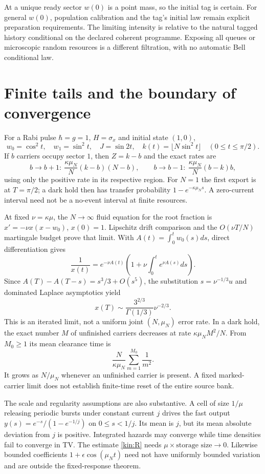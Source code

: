 \documentclass[11pt,oneside,openany]{book}
\theoremstyle{definition}
\theoremstyle{remark}\newtheorem{remark}[theorem]{Remark}
\begin{document}
At a unique ready sector $w(0)$ is a point mass, so the initial tag is
certain. For general $w(0)$, population calibration and the tag's initial
law remain explicit preparation requirements. The limiting intensity is
relative to the natural tagged history conditional on the declared
coherent programme. Exposing all queues or microscopic random resources
is a different filtration, with no automatic Bell conditional law.

\section{Finite tails and the boundary of convergence}
For a Rabi pulse $\hbar=g=1$, $H=\sigma_x$ and initial state $(1,0)$,
\[
 w_0=\cos^2t,\quad w_1=\sin^2t,\quad J=\sin2t,\quad
 k(t)=\lfloor N\sin^2t\rfloor\quad(0\le t\le\pi/2).
\]
If $b$ carriers occupy sector $1$, then $Z=k-b$ and the exact rates are
\begin{equation}
 b\to b+1:\ \frac{\kappa\mu_N}{N}(k-b)(N-b),\qquad
 b\to b-1:\ \frac{\kappa\mu_N}{N}(b-k)b,
 \label{kin:binaryrates}
\end{equation}
using only the positive rate in its respective region. For $N=1$ the
first export is at $T=\pi/2$; a dark hold then has transfer probability
$1-e^{-\kappa\mu_Ns}$. A zero-current interval need not be a no-event
interval at finite resources.

At fixed $\nu=\kappa\mu$, the $N\to\infty$ fluid equation for the root
fraction is $x'=-\nu x(x-w_0)$, $x(0)=1$. Lipschitz drift comparison and
the $O(\nu T/N)$ martingale budget prove that limit. With
$A(t)=\int_0^tw_0(s)ds$, direct differentiation gives
\[
 \frac1{x(t)}=e^{-\nu A(t)}\left(1+\nu\int_0^te^{\nu A(s)}ds\right).
\]
Since $A(T)-A(T-s)=s^3/3+O(s^5)$, the substitution
$s=\nu^{-1/3}u$ and dominated Laplace asymptotics yield
\begin{equation}
 x(T)\sim\frac{3^{2/3}}{\Gamma(1/3)}\nu^{-2/3}.
 \label{kin:boundarylayer}
\end{equation}
This is an iterated limit, not a uniform joint $(N,\mu_N)$ error rate.
In a dark hold, the exact number $M$ of unfinished carriers decreases at
rate $\kappa\mu_NM^2/N$. From $M_0\ge1$ its mean clearance time is
\[
 \frac{N}{\kappa\mu_N}\sum_{m=1}^{M_0}\frac1{m^2}.
\]
It grows as $N/\mu_N$ whenever an unfinished carrier is present. A fixed
marked-carrier limit does not establish finite-time reset of the entire
source bank.

The scale and regularity assumptions are also substantive. A cell of size
$1/\mu$ releasing periodic bursts under constant current $j$ drives the
fast output $y(s)=e^{-s}/(1-e^{-1/j})$ on $0\le s<1/j$.
Its mean is $j$, but its mean absolute deviation from $j$ is positive.
Integrated hazards may converge while time densities fail to converge in
TV. The estimate \eqref{kin:R} needs $\mu\times\text{storage size}\to0$.
Likewise bounded coefficients $1+\epsilon\cos(\mu_Nt)$ need not have
uniformly bounded variation and are outside the fixed-response theorem.
\end{document}
